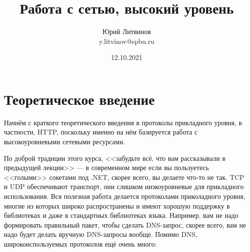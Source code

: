 \documentclass[a5paper]{article}
\title{Работа с сетью, высокий уровень}
\author{Юрий Литвинов\\\small{y.litvinov@spbu.ru}}
\date{12.10.2021}
\begin{document}
\maketitle
\thispagestyle{empty}

\section{Теоретическое введение}

Начнём с краткого теоретического введения в протоколы прикладного уровня, в частности, HTTP, поскольку именно на нём базируется работа с высокоуровневыми сетевыми ресурсами.

По доброй традиции этого курса, <<забудьте всё, что вам рассказывали в предыдущей лекции>> --- в современном мире если вы пользуетесь <<голыми>> сокетами под .NET, скорее всего, вы делаете что-то не так. TCP и UDP обеспечивают транспорт, они слишком низкоуровневые для прикладного использования. Вся полезная работа делается протоколами приколадного уровня, многие из которых широко распространены и имеют хорошую поддержку в библиотеках и даже в стандартных библиотеках языка. Например, вам не надо формировать правильный пакет, чтобы сделать DNS-запрос, скорее всего, вам не надо будет делать вручную DNS-запросы вообще. Помимо DNS, широкоиспользуемых протоколов ещё очень много:
\end{document}
